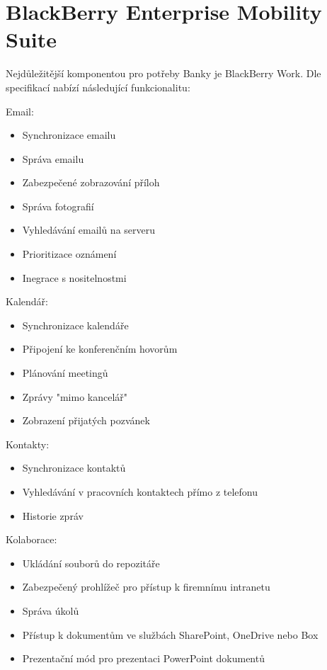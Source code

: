 \section{BlackBerry Enterprise Mobility Suite}

Nejdůležitější komponentou pro potřeby Banky je BlackBerry Work. Dle specifikací \cite{BBSpecs}%
 nabízí následující funkcionalitu:

Email:
\begin{itemize}
    \item Synchronizace emailu
    \item Správa emailu
    \item Zabezpečené zobrazování příloh
    \item Správa fotografií
    \item Vyhledávání emailů na serveru
    \item Prioritizace oznámení
    \item Inegrace s nositelnostmi
\end{itemize}

Kalendář:
\begin{itemize}
 \item Synchronizace kalendáře
 \item Připojení ke konferenčním hovorům
 \item Plánování meetingů
 \item Zprávy "mimo kancelář"
 \item Zobrazení přijatých pozvánek
\end{itemize}

Kontakty:
\begin{itemize}
   \item Synchronizace kontaktů
   \item Vyhledávání v pracovních kontaktech přímo z telefonu
   \item Historie zpráv
\end{itemize}

Kolaborace:
\begin{itemize}
   \item Ukládání souborů do repozitáře
   \item Zabezpečený prohlížeč pro přístup k firemnímu intranetu
   \item Správa úkolů
   \item Přístup k dokumentům ve službách SharePoint, OneDrive nebo Box
   \item Prezentační mód pro prezentaci PowerPoint dokumentů
\end{itemize}

